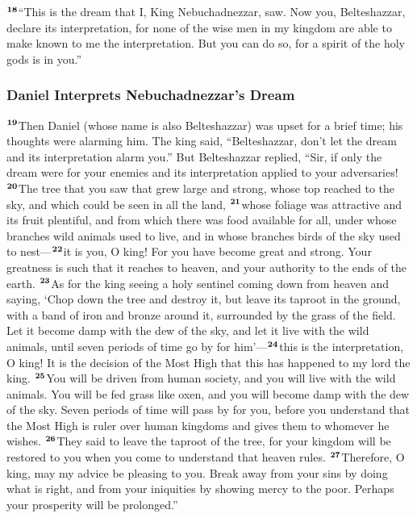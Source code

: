 \documentclass[12pt,a4paper,final]{article}
\renewcommand{\textsuperscript}[1]{\ensuremath{^{\textbf{\scriptsize #1}}}}
\begin{document}
\textsuperscript{18}“This is the dream that I, King Nebuchadnezzar, saw. Now you, Belteshazzar, declare its interpretation, for none of the wise men in my kingdom are able to make known to me the interpretation. But you can do so, for a spirit of the holy gods is in you.” 


\subsubsection*{Daniel Interprets Nebuchadnezzar’s Dream}

\textsuperscript{19}Then Daniel (whose name is also Belteshazzar) was upset for a brief time; his thoughts were alarming him. The king said, “Belteshazzar, don’t let the dream and its interpretation alarm you.” But Belteshazzar replied, “Sir, if only the dream were for your enemies and its interpretation applied to your adversaries! \textsuperscript{20}The tree that you saw that grew large and strong, whose top reached to the sky, and which could be seen in all the land, \textsuperscript{21}whose foliage was attractive and its fruit plentiful, and from which there was food available for all, under whose branches wild animals used to live, and in whose branches birds of the sky used to nest—\textsuperscript{22}it is you, O king! For you have become great and strong. Your greatness is such that it reaches to heaven, and your authority to the ends of the earth. \textsuperscript{23}As for the king seeing a holy sentinel coming down from heaven and saying, ‘Chop down the tree and destroy it, but leave its taproot in the ground, with a band of iron and bronze around it, surrounded by the grass of the field. Let it become damp with the dew of the sky, and let it live with the wild animals, until seven periods of time go by for him’—\textsuperscript{24}this is the interpretation, O king! It is the decision of the Most High that this has happened to my lord the king. \textsuperscript{25}You will be driven from human society, and you will live with the wild animals. You will be fed grass like oxen, and you will become damp with the dew of the sky. Seven periods of time will pass by for you, before you understand that the Most High is ruler over human kingdoms and gives them to whomever he wishes. \textsuperscript{26}They said to leave the taproot of the tree, for your kingdom will be restored to you when you come to understand that heaven rules. \textsuperscript{27}Therefore, O king, may my advice be pleasing to you. Break away from your sins by doing what is right, and from your iniquities by showing mercy to the poor. Perhaps your prosperity will be prolonged.”
 
\end{document}
